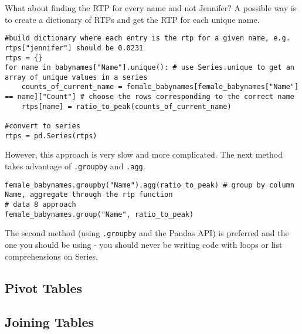 What about finding the RTP for every name and not Jennifer? A possible way is to create a dictionary of RTPs and get the RTP for each unique name.
\begin{verbatim}
#build dictionary where each entry is the rtp for a given name, e.g. rtps["jennifer"] should be 0.0231
rtps = {}
for name in babynames["Name"].unique(): # use Series.unique to get an array of unique values in a series
    counts_of_current_name = female_babynames[female_babynames["Name"] == name]["Count"] # choose the rows corresponding to the correct name
    rtps[name] = ratio_to_peak(counts_of_current_name)

#convert to series
rtps = pd.Series(rtps)
\end{verbatim}
However, this approach is very slow and more complicated. The next method takes advantage of \texttt{.groupby} and \texttt{.agg}.

\begin{verbatim}
female_babynames.groupby("Name").agg(ratio_to_peak) # group by column Name, aggregate through the rtp function
# data 8 approach 
female_babynames.group("Name", ratio_to_peak)
\end{verbatim}

\begin{notebox}[]
The second method (using \texttt{.groupby} and the Pandas API) is preferred and the one you should be using - you should never be writing code with loops or list comprehensions on Series.
\end{notebox}



\subsection{Pivot Tables}

\subsection{Joining Tables}



